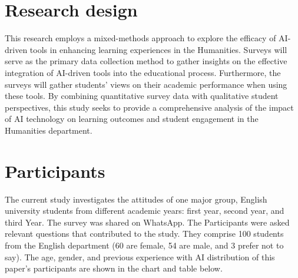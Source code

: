 \section{Research design}
This research employs a mixed-methods approach to explore the efficacy of AI-driven 
tools in enhancing learning experiences in the Humanities. Surveys will serve as the 
primary data collection method to gather insights on the effective integration of AI-driven
tools into the educational process. Furthermore, the surveys will gather students' views on 
their academic performance when using these tools. By combining quantitative survey data with
qualitative student perspectives, this study seeks to provide a comprehensive analysis of the 
impact of AI technology on learning outcomes and student engagement in the Humanities department.

\section{Participants}
The current study investigates the attitudes of one major group, English university students 
from different academic years: first year, second year, and third Year. The survey was 
shared on WhatsApp. The Participants were asked relevant questions that contributed to the study. 
They comprise 100 students from the English department (60 are female, 54 are male, and 3 prefer not to say).
The age, gender, and previous experience with AI distribution of this paper’s 
participants are shown in the chart and table below.

